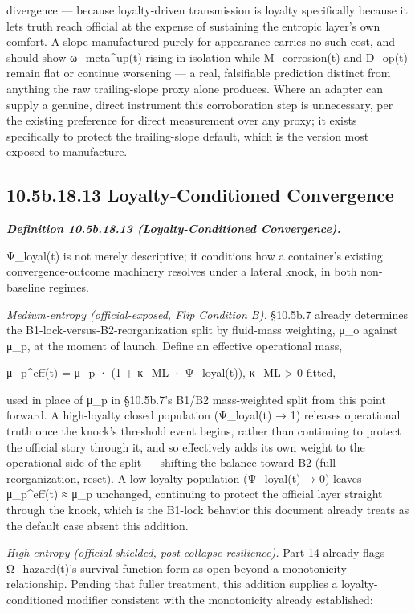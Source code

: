 \documentclass[
]{article}
\begin{document}
divergence --- because loyalty-driven transmission is loyalty
specifically because it lets truth reach official at the expense of
sustaining the entropic layer's own comfort. A slope manufactured purely
for appearance carries no such cost, and should show ω\_meta\^{}up(t)
rising in isolation while M\_corrosion(t) and D\_op(t) remain flat or
continue worsening --- a real, falsifiable prediction distinct from
anything the raw trailing-slope proxy alone produces. Where an adapter
can supply a genuine, direct instrument this corroboration step is
unnecessary, per the existing preference for direct measurement over any
proxy; it exists specifically to protect the trailing-slope default,
which is the version most exposed to manufacture.

\hypertarget{b.18.13-loyalty-conditioned-convergence}{%
\subsection{10.5b.18.13 Loyalty-Conditioned
Convergence}\label{b.18.13-loyalty-conditioned-convergence}}

\emph{\textbf{Definition 10.5b.18.13 (Loyalty-Conditioned
Convergence).}}

Ψ\_loyal(t) is not merely descriptive; it conditions how a container's
existing convergence-outcome machinery resolves under a lateral knock,
in both non-baseline regimes.

\emph{Medium-entropy (official-exposed, Flip Condition B).} §10.5b.7
already determines the B1-lock-versus-B2-reorganization split by
fluid-mass weighting, μ\_o against μ\_p, at the moment of launch. Define
an effective operational mass,

μ\_p\^{}eff(t) = μ\_p · (1 + κ\_ML · Ψ\_loyal(t)), κ\_ML \textgreater{}
0 fitted,

used in place of μ\_p in §10.5b.7's B1/B2 mass-weighted split from this
point forward. A high-loyalty closed population (Ψ\_loyal(t) → 1)
releases operational truth once the knock's threshold event begins,
rather than continuing to protect the official story through it, and so
effectively adds its own weight to the operational side of the split ---
shifting the balance toward B2 (full reorganization, reset). A
low-loyalty population (Ψ\_loyal(t) → 0) leaves μ\_p\^{}eff(t) ≈ μ\_p
unchanged, continuing to protect the official layer straight through the
knock, which is the B1-lock behavior this document already treats as the
default case absent this addition.

\emph{High-entropy (official-shielded, post-collapse resilience).} Part
14 already flags Ω\_hazard(t)'s survival-function form as open beyond a
monotonicity relationship. Pending that fuller treatment, this addition
supplies a loyalty-conditioned modifier consistent with the monotonicity
already established:
\end{document}
